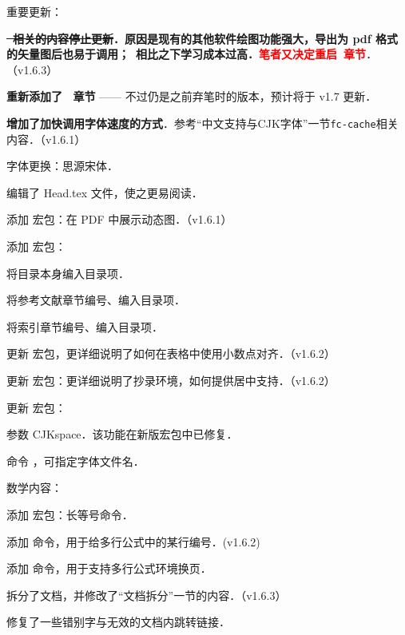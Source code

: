 \begin{feai}
\item 重要更新：
  \begin{feai}
  \item \textbf{\sout{\tikzz\  相关的内容停止更新}．原因是现有的其他软件绘图功能强大，导出为 pdf 格式的矢量图后也易于调用；\tikzz\  相比之下学习成本过高．}\textcolor{red}{\textbf{笔者又决定重启\tikzz\ 章节}}．（v1.6.3）
  \item \textbf{重新添加了 \tikzz\  章节} —— 不过仍是之前弃笔时的版本，预计将于 v1.7 更新．
  \item \textbf{增加了加快\xelatex 调用字体速度的方式}．参考“中文支持与CJK字体”一节\texttt{fc-cache}相关内容．（v1.6.1）
  \end{feai}
\item 字体更换：思源宋体．
\item 编辑了 Head.tex 文件，使之更易阅读．
\begin{feai}
\item [添加]宏包：在 PDF 中展示动态图．（v1.6.1）
\item [添加]宏包：
  \begin{feai}
  \item 将目录本身编入目录项．
  \item 将参考文献章节编号、编入目录项．
  \item 将索引章节编号、编入目录项．
  \end{feai}
\item [更新]宏包，更详细说明了如何在表格中使用小数点对齐．（v1.6.2）
\item [更新]宏包：更详细说明了抄录环境，如何提供居中支持．（v1.6.2）
\item [更新]宏包：
  \begin{feai}
  \item 参数 CJKspace．该功能在新版宏包中已修复．
  \item 命令 ，可指定字体文件名．
  \end{feai}
\end{feai}
\item 数学内容：
  \begin{feai}
  \item [添加]宏包：长等号命令．
  \item [添加]命令，用于给多行公式中的某行编号．(v1.6.2)
  \item [添加]命令，用于支持多行公式环境换页．
  \end{feai}
\item 拆分了文档，并修改了“文档拆分”一节的内容．（v1.6.3）
\item 修复了一些错别字与无效的文档内跳转链接．
\end{feai}

